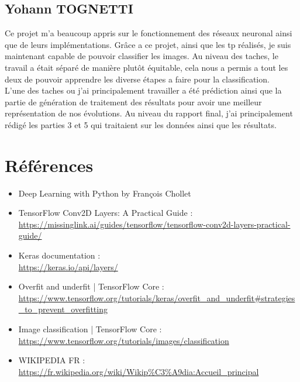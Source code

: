 \documentclass[12pt ,a4paper ]{article}
\begin{document}
\subsection{Yohann TOGNETTI}
Ce projet m'a beaucoup appris sur le fonctionnement des réseaux neuronal ainsi que de leurs implémentations. Grâce a ce projet, ainsi que les tp réalisés, je suis maintenant capable de pouvoir classifier les images. Au niveau des taches, le travail a était séparé de manière plutôt équitable, cela nous a permis a tout les deux de pouvoir apprendre les diverse étapes a faire pour la classification.\\
L'une des taches ou j'ai principalement travailler a été prédiction ainsi que la partie de génération de traitement des résultats pour avoir une meilleur représentation de nos évolutions. 
Au niveau du rapport final, j'ai principalement rédigé les parties 3 et 5 qui traitaient sur les données ainsi que les résultats.
\newpage
\section{Références}
\begin{itemize}
\item Deep Learning with Python by François Chollet 
\item TensorFlow Conv2D Layers: A Practical Guide :\\ \url{https://missinglink.ai/guides/tensorflow/tensorflow-conv2d-layers-practical-guide/}%
\item Keras documentation :\\ \url{https://keras.io/api/layers/}%
\item Overfit and underfit  |  TensorFlow Core :\\ \url{https://www.tensorflow.org/tutorials/keras/overfit_and_underfit#strategies_to_prevent_overfitting}%
\item Image classification  |  TensorFlow Core :\\ \url{https://www.tensorflow.org/tutorials/images/classification}%
\item WIKIPEDIA FR :\\ \url{https://fr.wikipedia.org/wiki/Wikip%C3%A9dia:Accueil_principal}%
\end{itemize}
\end{document}
